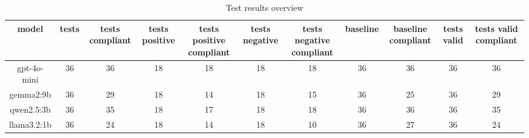 
  \begin{table}[h!]
  \centering
  \begin{tabular}{|c|c|c|c|c|c|c|c|c|c|c|}
  \hline
  model & tests & tests compliant & tests positive & tests positive compliant & tests negative & tests negative compliant & baseline & baseline compliant & tests valid & tests valid compliant \\
  \hline
  gpt-4o-mini & 36 & 36 & 18 & 18 & 18 & 18 & 36 & 36 & 36 & 36\\
\hline
gemma2:9b & 36 & 29 & 18 & 14 & 18 & 15 & 36 & 25 & 36 & 29\\
\hline
qwen2.5:3b & 36 & 35 & 18 & 17 & 18 & 18 & 36 & 36 & 36 & 35\\
\hline
llama3.2:1b & 36 & 24 & 18 & 14 & 18 & 10 & 36 & 27 & 36 & 24
  \end{tabular}
  \caption{Test results overview}
  
  \end{table}
  